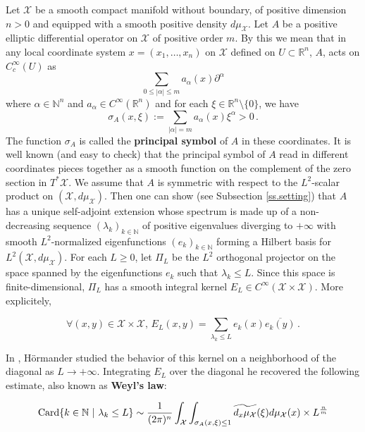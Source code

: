 \documentclass[10pt,twoside]{article}
\newcommand{\R}{\mathbb{R}}
\newcommand{\N}{\mathbb{N}}
\newcommand{\man}{\mathcal{X}}
\numberwithin{theorem}{section}
\begin{document}
Let $\man$ be a smooth compact manifold without boundary, of positive dimension $n>0$ and equipped with a smooth positive density $d\mu_\man$. Let $A$ be a positive elliptic differential operator on $\man$ of positive order $m$. By this we mean that in any local coordinate system $x=(x_1,\dots,x_n)$ on $\man$ defined on $U\subset\R^n$, $A$, acts on $C^\infty_c(U)$ as
\[
\sum_{0\leq |\alpha|\leq m} a_{\alpha}(x)\partial^\alpha
\]
where $\alpha\in\N^n$ and $a_\alpha\in C^\infty(\R^n)$ and for each $\xi\in\R^n\setminus\{0\}$, we have
\[
\sigma_A(x,\xi):=\sum_{|\alpha|=m}a_\alpha(x)\xi^\alpha>0\, .
\]
The function $\sigma_A$ is called the \textbf{principal symbol} of $A$ in these coordinates. It is well known (and easy to check) that the principal symbol of $A$ read in different coordinates pieces together as a smooth function on the complement of the zero section in $T^*\man$. We assume that $A$ is symmetric with respect to the $L^2$-scalar  product on $(\man,d\mu_\man)$. Then one can show (see Subsection \ref{ss.setting}) that $A$ has a unique self-adjoint extension whose spectrum is made up of a non-decreasing sequence $(\lambda_k)_{k\in\N}$ of positive eigenvalues diverging to $+\infty$ with smooth $L^2$-normalized eigenfunctions $(e_k)_{k\in\N}$ forming a Hilbert basis for $L^2(\man,d\mu_\man)$. For each $L\geq 0$, let $\Pi_L$ be the $L^2$ orthogonal projector on the space spanned by the eigenfunctions $e_k$ such that $\lambda_k\leq L$. Since this space is finite-dimensional, $\Pi_L$ has a smooth integral kernel $E_L\in C^\infty(\man\times\man)$. More explicitely,

\[
\forall (x,y)\in\man\times\man,\, E_L(x,y)=\sum_{\lambda_k\leq L}e_k(x)\overline{e_k(y)}\, .
\]

In \cite{ho68}, H\"ormander studied the behavior of this kernel on a neighborhood of the diagonal as $L\rightarrow+\infty$. Integrating $E_L$ over the diagonal he recovered the following estimate, also known as \textbf{Weyl's law}:

\[
  \textup{Card}\{k\in\N\ |\ \lambda_k\leq L\}\sim \frac{1}{(2\pi)^n}\int_\man\int_{\sigma_A(x,\xi)\leq 1}\widetilde{d_x\mu_\man}(\xi) d\mu_\man(x)\times L^{\frac{n}{m}}
\]
\end{document}
